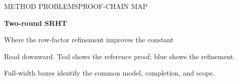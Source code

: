 \documentclass[11pt]{article}
\numberwithin{equation}{section}
\theoremstyle{definition}\newtheorem{definition}[theorem]{Definition}
\theoremstyle{remark}\newtheorem{remark}[theorem]{Remark}
\begin{document}
\thispagestyle{empty}
{\sffamily\color{Navy}\small METHOD PROBLEMS\hfill PROOF-CHAIN MAP\par}
\vspace{3mm}
{\sffamily\bfseries\fontsize{24}{28}\selectfont Two-round SRHT\par}
\vspace{1.5mm}
{\sffamily\large Where the row-factor refinement improves the constant\par}
\vspace{2mm}
{\small Read downward. Teal shows the reference proof; blue shows the refinement.\par
Full-width boxes identify the common model, completion, and scope.\par}
\vspace{2mm}

\newlength{\ProofFullWidth}
\setlength{\ProofFullWidth}{\dimexpr\textwidth-16pt\relax}
\newlength{\ProofColumnWidth}
\setlength{\ProofColumnWidth}{.5\textwidth}
\addtolength{\ProofColumnWidth}{-5mm}
\addtolength{\ProofColumnWidth}{-14pt}
\newlength{\ProofColumnOffset}
\setlength{\ProofColumnOffset}{.25\textwidth}
\addtolength{\ProofColumnOffset}{2.5mm}
\end{document}
